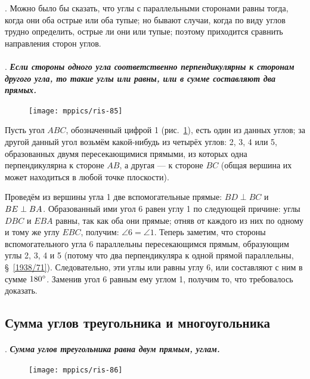 \documentclass[oneside]{book}
\begin{document}
.
Можно было бы сказать, что углы с параллельными сторонами равны тогда, когда они оба острые или оба тупые;
но бывают случаи, когда по виду углов трудно определить, острые ли они или тупые;
поэтому приходится сравнить направления сторон углов.

\paragraph{}\label{1938/80}
.
\textbf{\emph{Если стороны одного угла соответственно перпендикулярны к сторонам другого угла, то такие углы или равны, или в сумме составляют два прямых.}}

\begin{figure}
\centering
\texttt{[image: mppics/ris-85]}
\caption{}\label{1938/ris-85}
\end{figure}

Пусть угол $ABC$, обозначенный цифрой 1 (рис.~\ref{1938/ris-85}), есть один из данных углов;
за другой данный угол возьмём какой-нибудь из четырёх углов:
2, 3, 4 или 5, образованных двумя пересекающимися прямыми, из которых одна перпендикулярна к стороне $AB$, а другая — к стороне $BC$ (общая вершина их может находиться в любой точке плоскости).

Проведём из вершины угла 1 две вспомогательные прямые:
$BD\perp BC$ и $BE\z\perp BA$.
Образованный ими угол 6 равен углу 1 по следующей причине:
углы $DBC$ и $EBA$ равны, так как оба они прямые;
отняв от каждого из них по одному и тому же углу $EBC$, получим: $\angle 6 = \angle 1$.
Теперь заметим, что стороны вспомогательного угла 6 параллельны пересекающимся прямым, образующим углы 2, 3, 4 и 5 (потому что два перпендикуляра к одной прямой параллельны, §~\ref{1938/71}). 
Следовательно, эти углы или равны углу 6, или составляют с ним в сумме $180\degree$.
Заменив угол 6 равным ему углом 1, получим то, что требовалось доказать.

\subsection*{Сумма углов треугольника и многоугольника}

\paragraph{}\label{1938/81}
\mbox{.}
\textbf{\emph{Сумма углов треугольника равна двум прямым, углам.}}

\begin{figure}
\centering
\texttt{[image: mppics/ris-86]}
\caption{}\label{1938/ris-86}
\end{figure}
\end{document}
